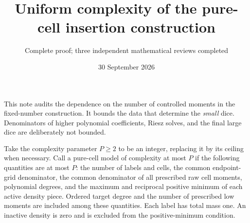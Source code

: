 \documentclass[11pt]{article}
\title{Uniform complexity of the pure-cell insertion construction}
\author{Complete proof; three independent mathematical reviews completed}
\date{30 September 2026}
\begin{document}
\maketitle
This note audits the dependence on the number of controlled moments in
the fixed-number construction. It bounds the data that determine the
\emph{small} dice. Denominators of higher polynomial coefficients,
Riesz solves, and the final large dice are deliberately not bounded.

Take the complexity parameter $P\ge2$ to be an integer, replacing it
by its ceiling when necessary. Call a pure-cell model of complexity at
most $P$ if the following
quantities are at most $P$: the number of labels and cells, the common
endpoint-grid denominator, the common denominator of all prescribed
raw cell moments, polynomial degrees, and the maximum and reciprocal
positive minimum of each active density piece. Ordered target degree
and the number of prescribed low moments are included among these
quantities. Each label has total mass one. An inactive density is zero
and is excluded from the positive-minimum condition.
\end{document}
